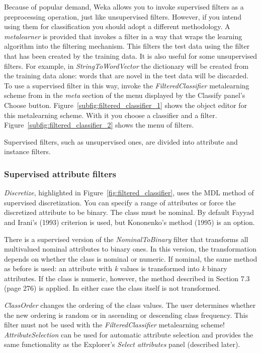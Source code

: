 Because of popular demand, Weka allows you to invoke supervised
filters as a preprocessing operation, just like unsupervised
filters. However, if you intend using them for classification you
should adopt a different methodology. A \textit{metalearner} is
provided that invokes a filter in a way that wraps the learning
algorithm into the filtering mechanism. This filters the test data
using the filter that has been created by the training data. It is
also useful for some unsupervised filters. For example, in
\textit{StringToWordVector} the dictionary will be created from the
training data alone: words that are novel in the test data will be
discarded. To use a supervised filter in this way, invoke the
\textit{FilteredClassifier} metalearning scheme from in the
\textit{meta} section of the menu displayed by the Classify panel's
Choose button. Figure~\ref{subfig:filtered_classifier_1} shows the
object editor for this metalearning scheme. With it you choose a
classifier and a filter. Figure~\ref{subfig:filtered_classifier_2}
shows the menu of filters.

Supervised filters, such as unsupervised ones, are divided into
attribute and instance filters.

\subsubsection{Supervised attribute filters}

\textit{Discretize}, highlighted in
Figure~\ref{fig:filtered_classifier}, uses the MDL method of
supervised discretization. You can specify a range of attributes or
force the discretized attribute to be binary. The class must be
nominal. By default Fayyad and Irani’s (1993) criterion is used, but
Kononenko’s method (1995) is an option.

There is a supervised version of the \textit{NominalToBinary} filter
that transforms all multivalued nominal attributes to binary ones. In
this version, the transformation depends on whether the class is
nominal or numeric. If nominal, the same method as before is used: an
attribute with \textit{k} values is transformed into \textit{k} binary
attributes. If the class is numeric, however, the method described in
Section 7.3 (page 276) is applied. In either case the class itself is
not transformed.

\textit{ClassOrder} changes the ordering of the class values. The user
determines whether the new ordering is random or in ascending or
descending class frequency. This filter must not be used with the
\textit{FilteredClassifier} metalearning scheme!
\textit{AttributeSelection} can be used for automatic attribute
selection and provides the same functionality as the Explorer’s
\textit{Select attributes} panel (described later).

